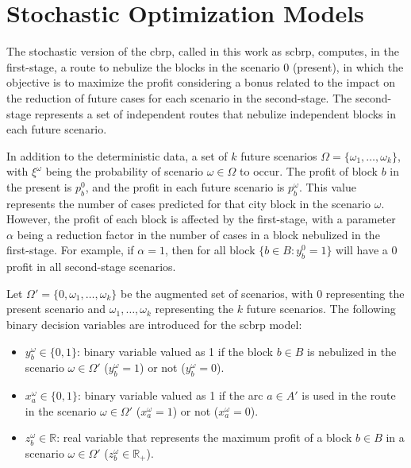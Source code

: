 \section{Stochastic Optimization Models}\label{sec:cbrp-stochastic-models}

The stochastic version of the \gls{cbrp}, called in this work as \gls{scbrp},
computes, in the first-stage, a route to nebulize the blocks in the scenario $0$
(present), in which the objective is to maximize the profit considering a bonus
related to the impact on the reduction of future cases for each scenario in the
second-stage. The second-stage represents a set of independent routes that
nebulize independent blocks in each future scenario. 

In addition to the deterministic data, a set of $k$ future scenarios $\Omega =
	\{\omega_1, \dots, \omega_k\}$, with $\xi^{\omega}$ being the probability of
scenario $\omega \in \Omega$ to occur. The profit of block $b$ in the
present is $p_{b}^{0}$, and the profit in each future scenario is
$p_{b}^{\omega}$. This value represents the number of cases predicted for
that city block in the scenario $\omega$. However, the profit of each block
is affected by the first-stage, with a parameter $\alpha$ being a reduction
factor in the number of cases in a block nebulized in the first-stage. For
example, if $\alpha = 1$, then for all block $\{b \in B: y_{b}^{0} = 1\}$
will have a $0$ profit in all second-stage scenarios.

Let $\Omega' = \{0, \omega_1, \dots, \omega_k\}$ be the augmented set of
scenarios, with $0$ representing the present scenario and $\omega_1, \dots,
	\omega_k$ representing the $k$ future scenarios. The following binary decision
variables are introduced for the \gls{scbrp} model:

\begin{itemize}
	\item $y_{b}^{\omega} \in \{0, 1\}$: binary variable valued as 1 if the block $b \in B$ is nebulized in the scenario $\omega \in \Omega'$ ($y_{b}^{\omega} = 1$) or not ($y_{b}^{\omega} = 0$).
	\item $x_{a}^{\omega} \in \{0, 1\}$: binary variable valued as 1 if the arc $a \in A'$ is used in the route in the scenario $\omega \in \Omega'$ ($x_{a}^{\omega} = 1$) or not ($x_{a}^{\omega} = 0$).
	\item $z_{b}^{\omega} \in \mathbb{R}$: real variable that represents the maximum profit of a block $b \in B$ in a scenario $\omega \in \Omega'$ ($z_{b}^{\omega} \in \mathbb{R}_{+}$).
\end{itemize}

